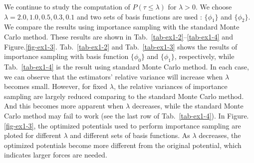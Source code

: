\documentclass[final]{siamltex}
\begin{document}
We continue to study the computation of $P(\tau \le \lambda)$ for $\lambda > 0$.
We choose $\lambda = 2.0, 1.0, 0.5, 0.3, 0.1$ and two sets of basis functions are used : $\{\phi_1\}$
and $\{\phi_2\}$. We compare the results using importance sampling with the
standard Monte Carlo method. These results are shown in
Tab.~\ref{tab-ex1-2}--\ref{tab-ex1-4} and Figure.\ref{fig-ex1-3}.
Tab.~\ref{tab-ex1-2} and Tab.~\ref{tab-ex1-3} shows the results of
importance sampling with basis function $\{\phi_0\}$ and $\{\phi_1\}$,
respectively, while Tab.~\ref{tab-ex1-4} is the result using standard Monte Carlo method.
In each case, we can observe that the estimators' relative variance will increase when $\lambda$ becomes
small. However, for fixed $\lambda$, the relative variances of importance
sampling are largely reduced comparing to the standard Monte Carlo method. And this becomes
more apparent when $\lambda$ decreases, while the standard Monte Carlo method
may fail to work (see the last row of Tab.~\ref{tab-ex1-4}).
In Figure.\ref{fig-ex1-3}, the optimized potentials used to perform importance sampling
are ploted for different $\lambda$ and different sets of basis functions. As
$\lambda$ decreases,
the optimized potentials become more different from the original
potential, which indicates larger forces are needed.
\end{document}
